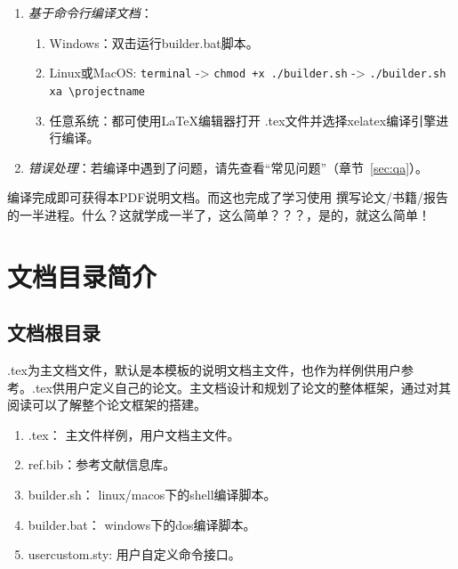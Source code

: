 \begin{enumerate}
        第四步，如图\ref{fig:vscode-pdfview}所示，点击“查看LaTeX PDF”。
 		\begin{figure}[!hptb]
            \centering
            \texttt{[image: doc/figures/vscode-\\projectname-pdf.jpg]}
            \caption{在vscode查看文档}
            \label{fig:vscode-pdfview}
        \end{figure}
 		

    \item \emph{基于命令行编译文档}：
        \begin{enumerate}
            \item Windows：双击运行builder.bat脚本。
            \item Linux或MacOS: {\scriptsize \verb|terminal| -> \verb|chmod +x ./builder.sh| -> \verb|./builder.sh xa \projectname|}
            \item 任意系统：都可使用\LaTeX{}编辑器打开 \projectname.tex文件并选择xelatex编译引擎进行编译。
        \end{enumerate}
    \item \emph{错误处理}：若编译中遇到了问题，请先查看“常见问题”（章节~\ref{sec:qa}）。
\end{enumerate}

编译完成即可获得本PDF说明文档。而这也完成了学习使用 \projectname 撰写论文/书籍/报告的一半进程。什么？这就学成一半了，这么简单？？？，是的，就这么简单！

\section{文档目录简介}

\subsection{文档根目录}

\projectname.tex为主文档文件，默认是本模板的说明文档主文件，也作为样例供用户参考。\projectname.tex供用户定义自己的论文。主文档设计和规划了论文的整体框架，通过对其阅读可以了解整个论文框架的搭建。


\begin{enumerate}
    \item \projectname.tex： 主文件样例，用户文档主文件。
    \item ref.bib：参考文献信息库。
    \item builder.sh： linux/macos下的shell编译脚本。
    \item builder.bat： windows下的dos编译脚本。
    \item usercustom.sty: 用户自定义命令接口。
\end{enumerate}

